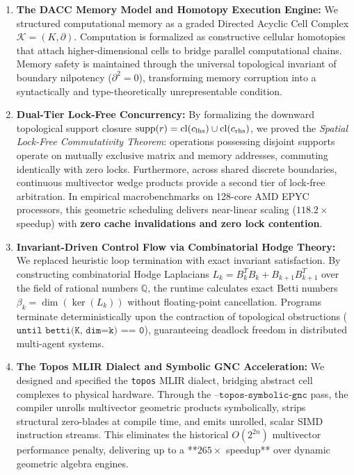 \begin{enumerate}[leftmargin=1.2cm]
    \item \textbf{The DACC Memory Model and Homotopy Execution Engine:}  
    We structured computational memory as a graded Directed Acyclic Cell Complex $\mathcal{K} = (K, \partial)$. Computation is formalized as constructive cellular homotopies that attach higher-dimensional cells to bridge parallel computational chains. Memory safety is maintained through the universal topological invariant of boundary nilpotency ($\partial^2 = 0$), transforming memory corruption into a syntactically and type-theoretically unrepresentable condition.

    \item \textbf{Dual-Tier Lock-Free Concurrency:}  
    By formalizing the downward topological support closure $\operatorname{supp}(r) = \operatorname{cl}(c_{\text{lhs}}) \cup \operatorname{cl}(c_{\text{rhs}})$, we proved the \textit{Spatial Lock-Free Commutativity Theorem}: operations possessing disjoint supports operate on mutually exclusive matrix and memory addresses, commuting identically with zero locks. Furthermore, across shared discrete boundaries, continuous multivector wedge products provide a second tier of lock-free arbitration. In empirical macrobenchmarks on 128-core AMD EPYC processors, this geometric scheduling delivers near-linear scaling ($118.2\times$ speedup) with \textbf{zero cache invalidations and zero lock contention}.

    \item \textbf{Invariant-Driven Control Flow via Combinatorial Hodge Theory:}  
    We replaced heuristic loop termination with exact invariant satisfaction. By constructing combinatorial Hodge Laplacians $L_k = B_k^T B_k + B_{k+1} B_{k+1}^T$ over the field of rational numbers $\mathbb{Q}$, the runtime calculates exact Betti numbers $\beta_k = \dim(\ker(L_k))$ without floating-point cancellation. Programs terminate deterministically upon the contraction of topological obstructions ($\texttt{until betti(K, dim=k) == 0}$), guaranteeing deadlock freedom in distributed multi-agent systems.

    \item \textbf{The Topos MLIR Dialect and Symbolic GNC Acceleration:}  
    We designed and specified the \texttt{topos} MLIR dialect, bridging abstract cell complexes to physical hardware. Through the $\texttt{--topos-symbolic-gnc}$ pass, the compiler unrolls multivector geometric products symbolically, strips structural zero-blades at compile time, and emits unrolled, scalar SIMD instruction streams. This eliminates the historical $O(2^{2n})$ multivector performance penalty, delivering up to a **$265\times$ speedup** over dynamic geometric algebra engines.
\end{enumerate}

